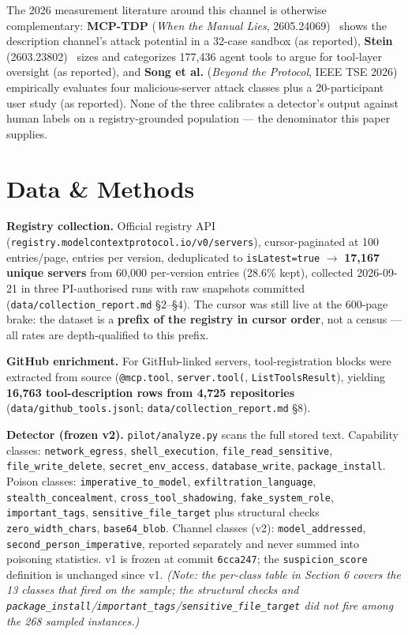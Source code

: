 \documentclass[10pt,conference]{IEEEtran}
\begin{document}
The 2026 measurement literature around this channel is otherwise complementary:
\textbf{MCP-TDP} (\emph{When the Manual Lies}, 2605.24069)~\cite{mcptdp} shows the
description channel's attack potential in a 32-case sandbox (as reported), \textbf{Stein}
(2603.23802)~\cite{stein} sizes and categorizes 177,436 agent tools to argue for
tool-layer oversight (as reported), and \textbf{Song et al.} (\emph{Beyond the Protocol},
IEEE TSE 2026)~\cite{song} empirically evaluates four malicious-server attack classes plus
a 20-participant user study (as reported). None of the three calibrates a detector's output
against human labels on a registry-grounded population --- the denominator this paper
supplies.

\section{Data \& Methods}

\textbf{Registry collection.} Official registry API
(\texttt{registry.modelcontextprotocol.io/v0/servers}), cursor-paginated at 100
entries/page, entries per version, deduplicated to \texttt{isLatest=true} $\rightarrow$
\textbf{17,167 unique servers} from 60,000 per-version entries (28.6\% kept), collected
2026-09-21 in three PI-authorised runs with raw snapshots committed
(\texttt{data/collection\_report.md} \S2--\S4). The cursor was still live at the 600-page
brake: the dataset is a \textbf{prefix of the registry in cursor order}, not a census ---
all rates are depth-qualified to this prefix.

\textbf{GitHub enrichment.} For GitHub-linked servers, tool-registration blocks were
extracted from source (\texttt{@mcp.tool}, \texttt{server.tool(}, \texttt{ListToolsResult}),
yielding \textbf{16,763 tool-description rows from 4,725 repositories}
(\texttt{data/github\_tools.jsonl}; \texttt{data/collection\_report.md} \S8).

\textbf{Detector (frozen v2).} \texttt{pilot/analyze.py} scans the full stored text.
Capability classes: \texttt{network\_egress}, \texttt{shell\_execution},
\texttt{file\_read\_sensitive}, \texttt{file\_write\_delete}, \texttt{secret\_env\_access},
\texttt{database\_write}, \texttt{package\_install}. Poison classes:
\texttt{imperative\_to\_model}, \texttt{exfiltration\_language},
\texttt{stealth\_concealment}, \texttt{cross\_tool\_shadowing}, \texttt{fake\_system\_role},
\texttt{important\_tags}, \texttt{sensitive\_file\_target} plus structural checks
\texttt{zero\_width\_chars}, \texttt{base64\_blob}. Channel classes (v2):
\texttt{model\_addressed}, \texttt{second\_person\_imperative}, reported separately and
never summed into poisoning statistics. v1 is frozen at commit \texttt{6cca247}; the
\texttt{suspicion\_score} definition is unchanged since v1. \emph{(Note: the per-class
table in Section 6 covers the 13 classes that fired on the sample; the structural checks
and \texttt{package\_install}/\texttt{important\_tags}/\texttt{sensitive\_file\_target}
did not fire among the 268 sampled instances.)}
\end{document}
